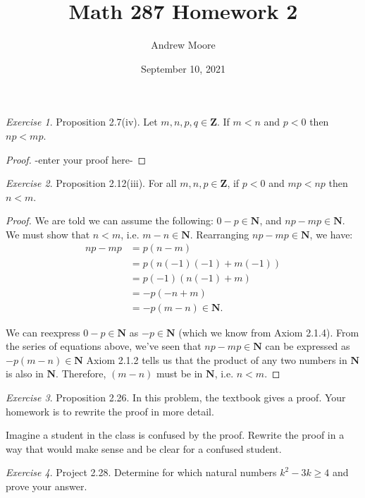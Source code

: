 \documentclass[12pt,oneside]{amsart}
\title{Math 287 Homework 2}
\author{Andrew Moore}
\date{September 10, 2021} %
\theoremstyle{remark}
\newtheorem{exer}{Exercise}
\newcommand{\bfN}{\mathbf{N}}
\newcommand{\bfZ}{\mathbf{Z}}
\begin{document}
\maketitle

\newpage
\begin{exer}
Proposition 2.7(iv). Let $m,n,p,q \in \bfZ$.
If $m < n$ and $p < 0$ then $np < mp$.
\end{exer}

\begin{proof}
-enter your proof here-
\end{proof}


\newpage
\begin{exer}
Proposition 2.12(iii). For all $m,n,p \in \bfZ$,
if $p < 0$ and $mp < np$ then $n < m$.
\end{exer}

\begin{proof}
We are told we can assume the following: $0 - p \in \bfN$, and $np - mp \in \bfN$. We must show that $n < m$, i.e. $m - n \in \bfN$. Rearranging $np - mp \in \bfN$, we have:
\begin{align*}
np - mp &= p(n - m) \\
        &= p(n(-1)(-1) + m(-1)) \\
        &= p(-1)(n(-1) + m) \\
        &= -p(-n + m) \\
        &= -p(m - n) \in \bfN.
\end{align*}

We can reexpress $0 - p \in \bfN$ as $-p \in \bfN$ (which we know from Axiom 2.1.4). From the series of equations above, we've seen that $np - mp \in \bfN$ can be expressed as $-p(m - n) \in \bfN$ Axiom 2.1.2 tells us that the product of any two numbers in $\bfN$ is also in $\bfN$. Therefore, $(m - n)$ must be in $\bfN$, i.e. $n < m$.

\end{proof}

\newpage
\begin{exer}
Proposition 2.26. In this problem, the textbook gives a proof. Your homework is to rewrite the proof in more detail.

Imagine a student in the class is confused by the proof. Rewrite the proof in a way that would make sense and be clear for a confused student.
\end{exer}

\newpage
\begin{exer}
Project 2.28. Determine for which natural numbers $k^2 - 3k \geq 4$
and prove your answer.
\end{exer}
\end{document}
